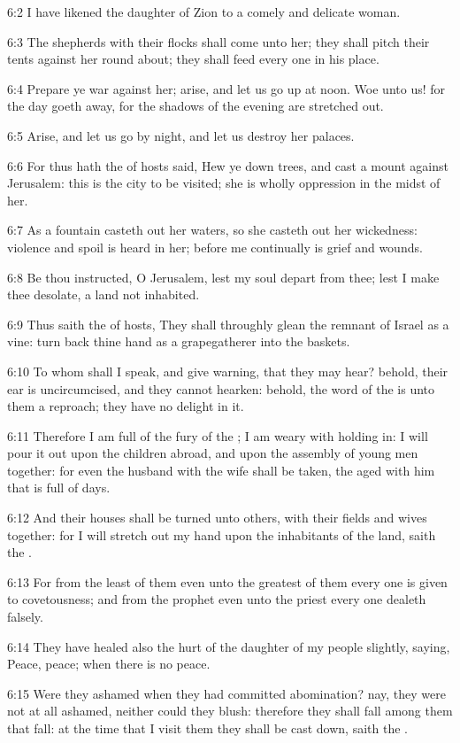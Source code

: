 6:2 I have likened the daughter of Zion to a comely and delicate woman.

6:3 The shepherds with their flocks shall come unto her; they shall pitch their tents against her round about; they shall feed every one in his place.

6:4 Prepare ye war against her; arise, and let us go up at noon. Woe unto us! for the day goeth away, for the shadows of the evening are stretched out.

6:5 Arise, and let us go by night, and let us destroy her palaces.

6:6 For thus hath the \LORD of hosts said, Hew ye down trees, and cast a mount against Jerusalem: this is the city to be visited; she is wholly oppression in the midst of her.

6:7 As a fountain casteth out her waters, so she casteth out her wickedness: violence and spoil is heard in her; before me continually is grief and wounds.

6:8 Be thou instructed, O Jerusalem, lest my soul depart from thee; lest I make thee desolate, a land not inhabited.

6:9 Thus saith the \LORD of hosts, They shall throughly glean the remnant of Israel as a vine: turn back thine hand as a grapegatherer into the baskets.

6:10 To whom shall I speak, and give warning, that they may hear?  behold, their ear is uncircumcised, and they cannot hearken: behold, the word of the \LORD is unto them a reproach; they have no delight in it.

6:11 Therefore I am full of the fury of the \LORD; I am weary with holding in: I will pour it out upon the children abroad, and upon the assembly of young men together: for even the husband with the wife shall be taken, the aged with him that is full of days.

6:12 And their houses shall be turned unto others, with their fields and wives together: for I will stretch out my hand upon the inhabitants of the land, saith the \LORD.

6:13 For from the least of them even unto the greatest of them every one is given to covetousness; and from the prophet even unto the priest every one dealeth falsely.

6:14 They have healed also the hurt of the daughter of my people slightly, saying, Peace, peace; when there is no peace.

6:15 Were they ashamed when they had committed abomination? nay, they were not at all ashamed, neither could they blush: therefore they shall fall among them that fall: at the time that I visit them they shall be cast down, saith the \LORD.

